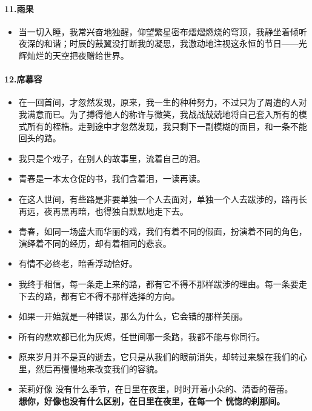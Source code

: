 \documentclass[UTF8,a4paper,8pt]{ctexart}
\begin{document}
 \paragraph{11.雨果}
 \begin{itemize}
 	\item 当一切入睡，我常兴奋地独醒，仰望繁星密布熠熠燃烧的穹顶，我静坐着倾听夜深的和谐；时辰的鼓翼没打断我的凝思，我激动地注视这永恒的节日——光辉灿烂的天空把夜赠给世界。
 \end{itemize}
 
 \paragraph{12.席慕容}
 \begin{itemize}
 	\item 在一回首间，才忽然发现，原来，我一生的种种努力，不过只为了周遭的人对我满意而已。为了搏得他人的称许与微笑，我战战兢兢地将自己套入所有的模式所有的桎梏。走到途中才忽然发现，我只剩下一副模糊的面目，和一条不能回头的路。
 	\item 我只是个戏子，在别人的故事里，流着自己的泪。
 	\item 青春是一本太仓促的书，我们含着泪，一读再读。
 	\item 在这人世间，有些路是非要单独一个人去面对，单独一个人去跋涉的，路再长再远，夜再黑再暗，也得独自默默地走下去。
 	\item 青春，如同一场盛大而华丽的戏，我们有着不同的假面，扮演着不同的角色，演绎着不同的经历，却有着相同的悲哀。
 	\item 有情不必终老，暗香浮动恰好。
 	\item 我终于相信，每一条走上来的路，都有它不得不那样跋涉的理由。每一条要走下去的路，都有它不得不那样选择的方向。
 	\item 如果一开始就是一种错误，那么为什么，它会错的那样美丽。
 	\item 所有的悲欢都已化为灰烬，任世间哪一条路，我都不能与你同行。
 	\item 原来岁月并不是真的逝去，它只是从我们的眼前消失，却转过来躲在我们的心里，然后再慢慢地来改变我们的容貌。
 	\item 茉莉好像
 	没有什么季节，在日里在夜里，时时开着小朵的、清香的蓓蕾。\\
 	\textbf{想你，好像也没有什么区别，在日里在夜里，在每一个 恍惚的刹那间。}
 \end{itemize}
 
\end{document}
